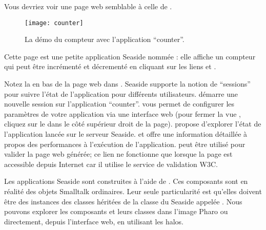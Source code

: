 \documentclass[a4paper,10pt,twoside]{book}
\begin{document}

\noindent
Vous devriez voir une page web semblable à celle de .

\noindent
{}


\begin{figure}[htb]
\begin{center}
\texttt{[image: counter]}
\caption{La démo du compteur avec l'application ``counter''.}
\end{center}
\end{figure}

\noindent
Cette page est une petite application Seaside nommée
: elle affiche un
compteur qui peut être incrémenté et décrementé en cliquant sur les
liens \link{++} et \link{--\,--}.

\noindent
{}

Notez la 
 en bas de la page web dans 
 .
Seaside supporte la notion de ``sessions'' pour suivre l'état de
l'application pour différents utilisateurs.
 démarre une nouvelle session sur l'application
``counter''.
 vous permet de 
configurer les paramètres de votre application via une interface
web (pour fermer la vue , cliquez sur le 
dans le côté supérieur droit de la page).
 propose d'explorer l'état de l'application
lancée sur le serveur Seaside.
 et  offre une information détaillée 
à propos des performances à l'exécution de l'application.
 peut être utilisé pour valider la page web générée;
ce lien ne fonctionne que lorsque la page est accessible depuis
Internet car il utilise le service de validation W3C.


Les applications Seaside sont construites à l'aide de
.
Ces composants sont en réalité des objets Smalltalk ordinaires.
Leur seule particularité est qu'elles doivent être des instances des
classes héritées de la classe du \framework Seaside appelée
.
Nous pouvons explorer les composants et leurs classes dans l'image
Pharo ou directement, depuis l'interface web, en utilisant les halos.
\end{document}
